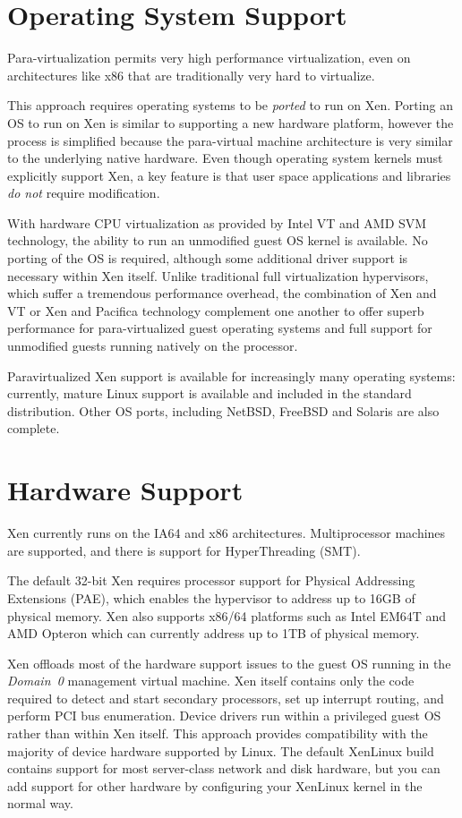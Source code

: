 \documentclass[11pt,twoside,final,openright]{report}
\begin{document}
\section{Operating System Support}

Para-virtualization permits very high performance virtualization, even
on architectures like x86 that are traditionally very hard to
virtualize.

This approach requires operating systems to be \emph{ported} to run on
Xen. Porting an OS to run on Xen is similar to supporting a new
hardware platform, however the process is simplified because the
para-virtual machine architecture is very similar to the underlying
native hardware. Even though operating system kernels must explicitly
support Xen, a key feature is that user space applications and
libraries \emph{do not} require modification.

With hardware CPU virtualization as provided by Intel VT and AMD
SVM technology, the ability to run an unmodified guest OS kernel
is available.  No porting of the OS is required, although some
additional driver support is necessary within Xen itself.  Unlike
traditional full virtualization hypervisors, which suffer a tremendous
performance overhead, the combination of Xen and VT or Xen and
Pacifica technology complement one another to offer superb performance
for para-virtualized guest operating systems and full support for
unmodified guests running natively on the processor.

Paravirtualized Xen support is available for increasingly many
operating systems: currently, mature Linux support is available and
included in the standard distribution.  Other OS ports, including
NetBSD, FreeBSD and Solaris are also complete. 


\section{Hardware Support}

Xen currently runs on the IA64 and x86 architectures. Multiprocessor
machines are supported, and there is support for HyperThreading (SMT).

The default 32-bit Xen requires processor support for Physical
Addressing Extensions (PAE), which enables the hypervisor to address
up to 16GB of physical memory. Xen also supports x86/64 platforms
such as Intel EM64T and AMD Opteron which can currently address up to
1TB of physical memory.

Xen offloads most of the hardware support issues to the guest OS
running in the \emph{Domain~0} management virtual machine. Xen itself
contains only the code required to detect and start secondary
processors, set up interrupt routing, and perform PCI bus
enumeration. Device drivers run within a privileged guest OS rather
than within Xen itself. This approach provides compatibility with the
majority of device hardware supported by Linux. The default XenLinux
build contains support for most server-class network and disk
hardware, but you can add support for other hardware by configuring
your XenLinux kernel in the normal way.
\end{document}
